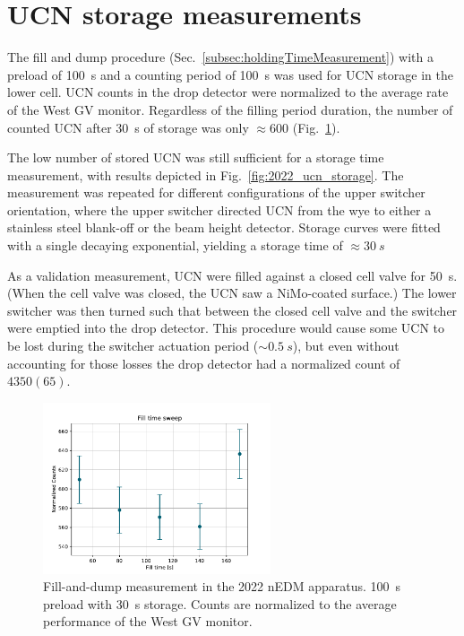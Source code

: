 
\section{UCN storage measurements}\label{sec:2022_ucn_storage_measurements}


The fill and dump procedure (Sec.~\ref{subsec:holdingTimeMeasurement}) with a preload of \qty{100}{s} and a counting period of \qty{100}{s} was used for UCN storage in the lower cell. UCN counts in the drop detector were normalized to the average rate of the West GV monitor. Regardless of the filling period duration, the number of counted UCN after \qty{30}{s} of storage was only $\approx 600$ (Fig.~\ref{fig:2022_fill_time_sweep}).

The low number of stored UCN was still sufficient for a storage time measurement, with results depicted in Fig.~\ref{fig:2022_ucn_storage}. The measurement was repeated for different configurations of the upper switcher orientation, where the upper switcher directed UCN from the wye to either a stainless steel blank-off or the beam height detector. Storage curves were fitted with a single decaying exponential, yielding a storage time of $\approx \qty{30}{s}$

As a validation measurement, UCN were filled against a closed cell valve for \qty{50}{s}. (When the cell valve was closed, the UCN saw a NiMo-coated surface.) The lower switcher was then turned such that \ucn between the closed cell valve and the switcher were emptied into the drop detector. This procedure would cause some UCN to be lost during the switcher actuation period ($\sim \qty{0.5}{s}$), but even without accounting for those losses the drop detector had a normalized count of $4350(65)$.

 \begin{figure}
    \centering
    \includegraphics[width=0.6\textwidth]{figures/2022_fill_sweep.pdf}
    \caption
     {Fill-and-dump measurement in the 2022 nEDM apparatus. \qty{100}{s} preload with \qty{30}{s} storage. Counts are normalized to the average performance of the West GV monitor.}
    \label{fig:2022_fill_time_sweep}
\end{figure}



